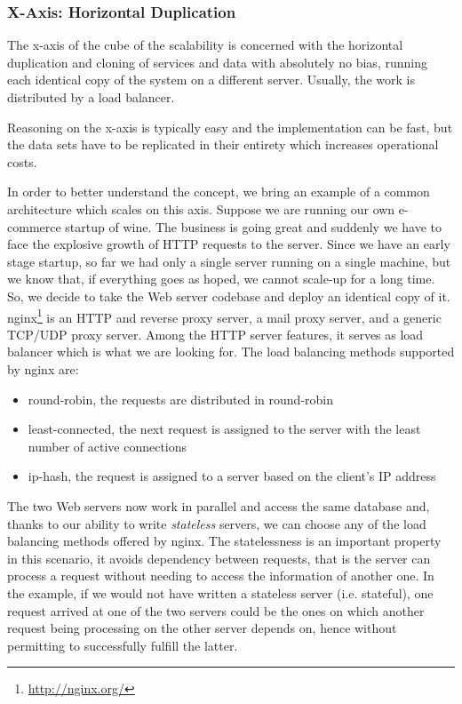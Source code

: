 \subsubsection{X-Axis: Horizontal Duplication}

The x-axis of the cube of the scalability is concerned with the horizontal
duplication and cloning of services and data with absolutely no bias, running
each identical copy of the system on a different server. Usually, the work is
distributed by a load balancer.

Reasoning on the x-axis is typically easy and the implementation can be fast,
but the data sets have to be replicated in their entirety which increases
operational costs.

In order to better understand the concept, we bring an example of a common
architecture which scales on this axis. Suppose we are running our own
e-commerce startup of wine. The business is going great and suddenly we have to
face the explosive growth of HTTP requests to the server. Since we have an early
stage startup, so far we had only a single server running on a single machine,
but we know that, if everything goes as hoped, we cannot scale-up for a long
time. So, we decide to take the Web server codebase and deploy an identical copy
of it. nginx\footnote{\url{http://nginx.org/}} is an HTTP and reverse proxy
server, a mail proxy server, and a generic TCP/UDP proxy server. Among the HTTP
server features, it serves as load balancer which is what we are looking for.
The load balancing methods supported by nginx are:

\begin{itemize}
  \item round-robin, the requests are distributed in round-robin
  \item least-connected, the next request is assigned to the server with the
  least number of active connections
  \item ip-hash, the request is assigned to a server based on the client's IP
  address
\end{itemize}

The two Web servers now work in parallel and access the same database and,
thanks to our ability to write \emph{stateless} servers, we can choose any of
the load balancing methods offered by nginx. The statelessness is an important
property in this scenario, it avoids dependency between requests, that is the
server can process a request without needing to access the information of
another one. In the example, if we would not have written a stateless server
(i.e. stateful), one request arrived at one of the two servers could be the ones
on which another request being processing on the other server depends on, hence
without permitting to successfully fulfill the latter.

